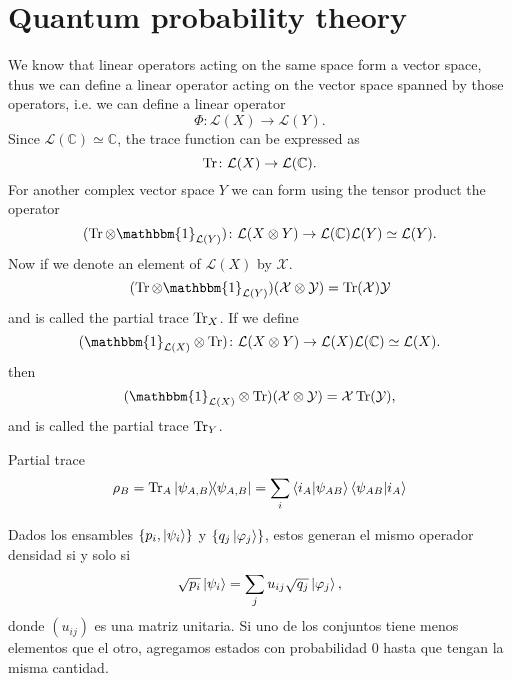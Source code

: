 \section{Quantum probability theory}
We know that linear operators acting on the same space form a vector space, thus we can define a linear operator acting on the vector space spanned by those operators, i.e. we can define a linear operator
\begin{equation}
	\Phi \colon \mathcal{L}(X)\to \mathcal{L}(Y).
\end{equation}
Since $\mathcal{L}(\mathbb{C}) \simeq \mathbb{C}$, the trace function can be expressed as
\begin{equation}
	\Tr\colon \mathcal{L}(X)\to \mathcal{L}(\mathbb{C}).
\end{equation}
For another complex vector space $Y$ we can form using the tensor product the operator
\begin{equation}
	(\Tr \otimes \mathbbm{1}_{\mathcal{L}(Y)})\colon \mathcal{L}(X \otimes Y)\to \mathcal{L}(\mathbb{C})\mathcal{L}(Y)\simeq \mathcal{L}(Y).
\end{equation}
Now if we denote an element of $\mathcal{L}(X)$ by $\mathcal{X}$.
\begin{equation}
	(\Tr \otimes \mathbbm{1}_{\mathcal{L}(Y)})(\mathcal{X} \otimes \mathcal{Y}) = \Tr(\mathcal{X}) \mathcal{Y}
\end{equation}
and is called the partial trace $\Tr_X$. If we define
\begin{equation}
	(\mathbbm{1}_{\mathcal{L}(X)}\otimes \Tr)\colon \mathcal{L}(X \otimes Y)\to \mathcal{L}(X)\mathcal{L}(\mathbb{C})\simeq \mathcal{L}(X).
\end{equation}
then
\begin{equation}
	(\mathbbm{1}_{\mathcal{L}(X)}\otimes \Tr)(\mathcal{X} \otimes \mathcal{Y}) = \mathcal{X}\Tr(\mathcal{Y}),
\end{equation}
and is called the partial trace $\Tr_Y$.
\begin{Definition}{Partial trace}{}
	\begin{equation*}
		\rho_B = \Tr_A \ketbra{\psi_{A,B}}{\psi_{A,B}} = \sum_i \braket{i_A}{\psi_{AB}}\braket{\psi_{AB}}{i_A}
	\end{equation*}
\end{Definition}
\begin{theorem}
	Dados los ensambles $\{p_i,\ket{\psi_i}\}$ y $\{q_j\ket{\varphi_j}\}$, estos generan el mismo operador densidad si y solo si \[\sqrt{p_i}\ket{\psi_i}=\sum_ju_{ij}\sqrt{q_j}\ket{\varphi_j},\]
	donde $(u_{ij})$ es una matriz unitaria. Si uno de los conjuntos tiene menos elementos que el otro, agregamos estados con probabilidad $0$ hasta que tengan la misma cantidad.
\end{theorem}
